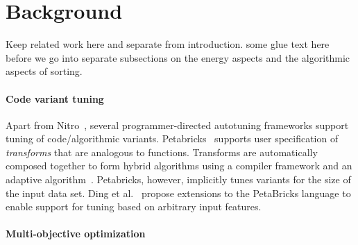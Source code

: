 \section{Background}
Keep related work here and separate from introduction. some glue text here before we go into separate subsections on the energy aspects and the algorithmic aspects of sorting.

\paragraph{Code variant tuning}
Apart from Nitro~\cite{muralidharan:2014},
several programmer-directed autotuning frameworks support
tuning of code/algorithmic variants.
Petabricks~\cite{PetaBricks} 
supports user specification of \textit{transforms} that
are analogous to functions. Transforms are automatically
composed together to form hybrid algorithms using a compiler
framework and an adaptive algorithm~\cite{increa11}. Petabricks, however,
implicitly tunes variants for the size of the input data set. Ding et
al.~\cite{ding:2015} propose extensions to the PetaBricks language to
enable support for tuning based on arbitrary input features.

\paragraph{Multi-objective optimization}
